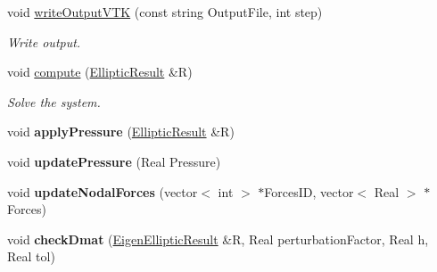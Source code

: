 \begin{DoxyCompactItemize}
\item 
\hypertarget{classvoom_1_1_mechanics_model_aa93918325d4e859b84d5d94b48a1ee0a}{
void \hyperlink{classvoom_1_1_mechanics_model_aa93918325d4e859b84d5d94b48a1ee0a}{writeOutputVTK} (const string OutputFile, int step)}
\label{classvoom_1_1_mechanics_model_aa93918325d4e859b84d5d94b48a1ee0a}

\begin{DoxyCompactList}\small\item\em Write output. \item\end{DoxyCompactList}\item 
\hypertarget{classvoom_1_1_mechanics_model_af61f345ea01fad5a81546b7511a7dada}{
void \hyperlink{classvoom_1_1_mechanics_model_af61f345ea01fad5a81546b7511a7dada}{compute} (\hyperlink{structvoom_1_1_elliptic_result}{EllipticResult} \&R)}
\label{classvoom_1_1_mechanics_model_af61f345ea01fad5a81546b7511a7dada}

\begin{DoxyCompactList}\small\item\em Solve the system. \item\end{DoxyCompactList}\item 
\hypertarget{classvoom_1_1_mechanics_model_a43aef052a6592002c1ab4784b6e65090}{
void {\bfseries applyPressure} (\hyperlink{structvoom_1_1_elliptic_result}{EllipticResult} \&R)}
\label{classvoom_1_1_mechanics_model_a43aef052a6592002c1ab4784b6e65090}

\item 
\hypertarget{classvoom_1_1_mechanics_model_abcabd201faad5676e8d9e3a540bf9279}{
void {\bfseries updatePressure} (Real Pressure)}
\label{classvoom_1_1_mechanics_model_abcabd201faad5676e8d9e3a540bf9279}

\item 
\hypertarget{classvoom_1_1_mechanics_model_ae8dfa2ea6eb9f08971389465bd477709}{
void {\bfseries updateNodalForces} (vector$<$ int $>$ $\ast$ForcesID, vector$<$ Real $>$ $\ast$Forces)}
\label{classvoom_1_1_mechanics_model_ae8dfa2ea6eb9f08971389465bd477709}

\item 
\hypertarget{classvoom_1_1_mechanics_model_a5523c57bc22db1193a3dd52edd46d1bc}{
void {\bfseries checkDmat} (\hyperlink{structvoom_1_1_eigen_elliptic_result}{EigenEllipticResult} \&R, Real perturbationFactor, Real h, Real tol)}
\label{classvoom_1_1_mechanics_model_a5523c57bc22db1193a3dd52edd46d1bc}


\end{DoxyCompactItemize}
